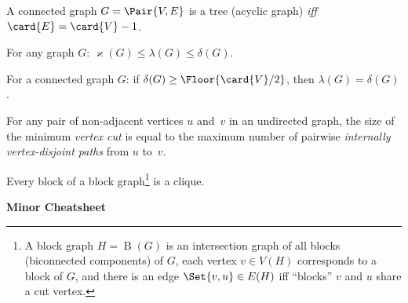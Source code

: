 \documentclass[a4paper,12pt]{article}
\newcommand{\op}[1]{\operatorname*{#1}}
\newcommand{\minDegree}[1]{\delta(#1)}
\newcommand{\vertexConnectivity}[1]{\varkappa(#1)}
\newcommand{\edgeConnectivity}[1]{\lambda(#1)}
\newcommand{\blockGraph}[1]{\op{B}(#1)}
\begin{document}
\begin{tasks}

    \begin{theorem}[Tree]
        A connected graph $G = \Pair{V, E}$ is a tree (\ie acyclic graph) \emph{iff} $\card{E} = \card{V} - 1$.
    \end{theorem}

    \begin{theorem}[Whitney]
        For any graph $G$: $\vertexConnectivity{G} \leq \edgeConnectivity{G} \leq \minDegree{G}$.
    \end{theorem}

    \begin{theorem}[Chartrand]
        For a connected graph $G$: if $\minDegree{G} \geq \Floor{\card{V} / 2}$, then $\edgeConnectivity{G} = \minDegree{G}$.
    \end{theorem}

    \begin{theorem}[Menger]
        For any pair of non-adjacent vertices $u$ and~$v$ in an undirected graph, the size of the minimum \emph{vertex cut} is equal to the maximum number of pairwise \emph{internally vertex-disjoint paths} from $u$ to~$v$.
    \end{theorem}

    \begin{theorem}[Harary]
        Every block of a block graph\footnote{A block graph $H = \blockGraph{G}$ is an intersection graph of all blocks (biconnected components) of $G$, \ie each vertex $v \in V(H)$ corresponds to a block of $G$, and there is an edge $\Set{v,u} \in E(H)$ iff \enquote{blocks} $v$ and $u$ share a cut vertex.} is a clique.
    \end{theorem}

\end{tasks}


\newpage

\centerline{\textbf{Minor Cheatsheet}}
\end{document}
